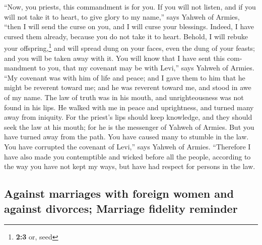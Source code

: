 \begin{paracol}{2}
\begin{otherlanguage}{english}
 ``Now, you priests, this commandment is for you.
 If you will not listen, and if you will not take it to
heart, to give glory to my name,'' says Yahweh of Armies, ``then I will
send the curse on you, and I will curse your blessings. Indeed, I have
cursed them already, because you do not take it to heart. 
Behold, I will rebuke your offspring,\footnote{\textbf{2:3} or, seed}
and will spread dung on your faces, even the dung of your feasts; and
you will be taken away with it.  You will know that I have
sent this commandment to you, that my covenant may be with Levi,'' says
Yahweh of Armies.  ``My covenant was with him of life and
peace; and I gave them to him that he might be reverent toward me; and
he was reverent toward me, and stood in awe of my name. 
The law of truth was in his mouth, and unrighteousness was not found in
his lips. He walked with me in peace and uprightness, and turned many
away from iniquity.  For the priest's lips should keep
knowledge, and they should seek the law at his mouth; for he is the
messenger of Yahweh of Armies.  But you have turned away
from the path. You have caused many to stumble in the law. You have
corrupted the covenant of Levi,'' says Yahweh of Armies. 
``Therefore I have also made you contemptible and wicked before all the
people, according to the way you have not kept my ways, but have had
respect for persons in the law.

\hypertarget{against-marriages-with-foreign-women-and-against-divorces-marriage-fidelity-reminder}{%
\subsection{Against marriages with foreign women and against divorces;
Marriage fidelity
reminder}\label{against-marriages-with-foreign-women-and-against-divorces-marriage-fidelity-reminder}}


\end{otherlanguage}
\end{paracol}
